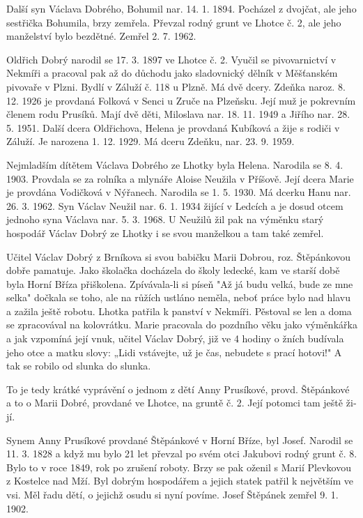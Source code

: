 \documentclass[../dejiny-rodu-prusiku.tex]{subfiles}
\begin{document}
Další syn Václava Dobrého, Bohumil nar. 14. 1. 1894. Pocházel z dvojčat, ale jeho sestřička Bohumila, brzy zemřela. Převzal rodný grunt ve Lhotce č. 2, ale jeho manželství bylo bezdětné. Zemřel 2. 7. 1962.


Oldřich Dobrý narodil se 17. 3. 1897 ve Lhotce č. 2. Vyučil se pivovarnictví v Nekmíři a pracoval pak až do důchodu jako sladovnický dělník v Měšťanském pivovaře v Plzni. Bydlí v Záluží č. 118 u Plzně. Má dvě dcery. Zdeňka naroz. 8. 12. 1926 je provdaná Fol­ková v Senci u Zruče na Plzeňsku. Její muž je pokrevním členem rodu Prusíků. Mají dvě děti, Miloslava nar. 18. 11. 1949 a Jiřího nar. 28. 5. 1951. Další dcera Oldři­chova, Helena je provdaná Kubíková a žije s rodiči v Záluží. Je narozena 1. 12. 1929. Má dceru Zdeňku, nar. 23. 9. 1959.

Nejmladším dítětem Václava Dobrého ze Lhotky byla Helena. Narodila se 8. 4. 1903. Provdala se za rolníka a mlynáře Aloise Neužila v Příšově. Její dcera Marie je provdána Vodičková v Nýřanech. Narodila se 1. 5. 1930. Má dcerku Hanu nar. 26. 3. 1962. Syn Václav Neužil nar. 6. 1. 1934 žijící v Ledcích a je dosud otcem jednoho syna Václava nar. 5. 3. 1968. U Neužilů žil pak na výměnku starý hospodář Václav Dobrý ze Lhotky i se svou manželkou a tam také zemřel.

Učitel Václav Dobrý z Brníkova si svou babičku Marii Dobrou, roz. Štěpánkovou dobře pamatuje. Jako školačka docházela do školy ledecké, kam ve starší době byla Horní Bříza přiškolena. Zpívávala-li si píseň "Až já budu velká, bude ze mne selka" dočkala se toho, ale na růžích ustláno neměla, neboť práce bylo nad hlavu a zažila ještě robotu. Lhotka patřila k panství v Nekmíři. Pěstoval se len a doma se zpracovával na kolovrátku. Marie pracovala do pozdního věku jako výměnkářka a jak vzpomíná její vnuk, učitel Václav Dobrý, již ve 4 hodi­ny o žních budívala jeho otce a matku slovy: „Lidi vstá­vejte, už je čas, nebudete s prací hotovi!" A tak se robilo od slunka do slunka.

To je tedy krátké vyprávění o jednom z dětí Anny Prusíkové, provd. Štěpánkové a to o Marii Dobré, provdané ve Lhotce, na gruntě č. 2. Její potomci tam ještě ži­jí.

Synem Anny Prusíkové provdané Štěpánkové v Horní Bříze, byl Josef. Narodil se 11. 3. 1828 a když mu bylo 21 let převzal po svém otci Jakubovi rodný grunt č. 8. Bylo to v roce 1849, rok po zrušení roboty. Brzy se pak oženil s Marií Plevkovou z Kostelce nad Mží. Byl dobrým hospodářem a jejich statek patřil k největším ve vsi. Měl řadu dětí, o jejichž osudu si nyní povíme. Josef Štěpánek zemřel 9. 1. 1902.
\end{document}
